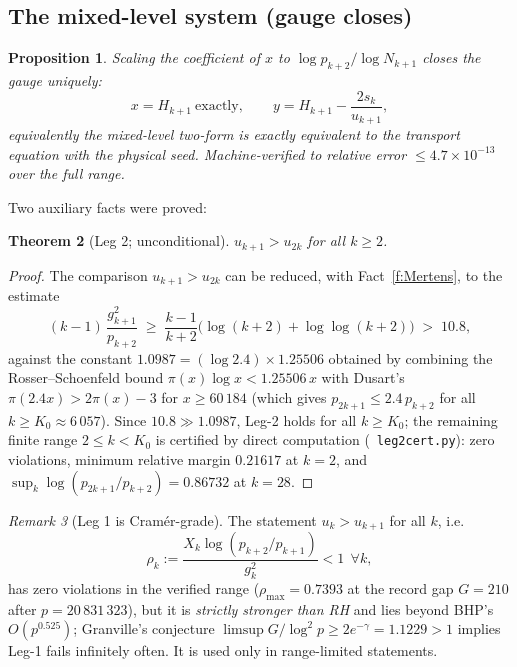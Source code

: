 \documentclass[11pt]{article}
\newtheorem{theorem}{Theorem}[section]
\newtheorem{proposition}[theorem]{Proposition}
\theoremstyle{remark}
\newtheorem{remark}[theorem]{Remark}
\newcommand{\Xk}{X_k}
\newcommand{\gam}{\gamma}
\begin{document}
\subsection{The mixed-level system (gauge closes)}

\begin{proposition}\label{prop:mixed}
Scaling the coefficient of $x$ to $\log p_{k+2}/\log N_{k+1}$ closes the gauge
uniquely:
\[
x=H_{k+1}\ \text{exactly},\qquad
y=H_{k+1}-\frac{2s_k}{u_{k+1}},
\]
equivalently the mixed-level two-form is exactly equivalent to the transport
equation with the physical seed. Machine-verified to relative error
$\le 4.7\times10^{-13}$ over the full range.
\end{proposition}

Two auxiliary facts were proved:

\begin{theorem}[Leg 2; unconditional]\label{thm:leg2}
$u_{k+1}>u_{2k}$ for all $k\ge2$.
\end{theorem}

\begin{proof}
The comparison $u_{k+1}>u_{2k}$ can be reduced, with
Fact~\ref{f:Mertens}, to the estimate
\[
(k-1)\,\frac{g_{k+1}^2}{p_{k+2}}\;\ge\;\frac{k-1}{k+2}\bigl(\log(k+2)+\log\log(k+2)\bigr)\;>\;10.8 ,
\]
against the constant $1.0987=(\log 2.4)\times1.25506$ obtained by combining the
Rosser--Schoenfeld bound $\pi(x)\log x<1.25506\,x$ with Dusart's
$\pi(2.4x)>2\pi(x)-3$ for $x\ge 60\,184$ (which gives $p_{2k+1}\le 2.4\,p_{k+2}$ for
all $k\ge K_0\approx 6\,057$). Since $10.8\gg1.0987$, Leg-2 holds for all
$k\ge K_0$; the remaining finite range $2\le k<K_0$ is certified by direct
computation (~\texttt{leg2cert.py}): zero violations, minimum relative margin
$0.21617$ at $k=2$, and $\sup_k\log(p_{2k+1}/p_{k+2})=0.86732$ at $k=28$.
\end{proof}

\begin{remark}[Leg 1 is Cram\'er-grade]\label{rem:leg1}
The statement $u_k>u_{k+1}$ for all $k$, i.e.
\[
\rho_k:=\frac{\Xk\log(p_{k+2}/p_{k+1})}{g_k^2}<1\ \ \forall k,
\]
has zero violations in the verified range
($\rho_{\max}=0.7393$ at the record gap $G=210$ after $p=20\,831\,323$), but it
is \emph{strictly stronger than RH} and lies beyond BHP's $O(p^{0.525})$;
Granville's conjecture $\limsup G/\log^2p\ge 2e^{-\gam}=1.1229>1$ implies
Leg-1 fails infinitely often. It is used only in range-limited statements.
\end{remark}
\end{document}
